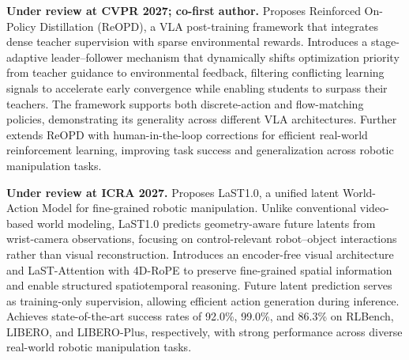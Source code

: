 \documentclass[10pt]{article}
\begin{document}
\textbf{Under review at CVPR 2027; co-first author.}
Proposes Reinforced On-Policy Distillation (ReOPD), a VLA post-training framework that integrates dense teacher supervision with sparse environmental rewards. Introduces a stage-adaptive leader--follower mechanism that dynamically shifts optimization priority from teacher guidance to environmental feedback, filtering conflicting learning signals to accelerate early convergence while enabling students to surpass their teachers. The framework supports both discrete-action and flow-matching policies, demonstrating its generality across different VLA architectures. Further extends ReOPD with human-in-the-loop corrections for efficient real-world reinforcement learning, improving task success and generalization across robotic manipulation tasks.

\textbf{Under review at ICRA 2027.}
Proposes LaST1.0, a unified latent World-Action Model for fine-grained robotic manipulation. Unlike conventional video-based world modeling, LaST1.0 predicts geometry-aware future latents from wrist-camera observations, focusing on control-relevant robot--object interactions rather than visual reconstruction. Introduces an encoder-free visual architecture and LaST-Attention with 4D-RoPE to preserve fine-grained spatial information and enable structured spatiotemporal reasoning. Future latent prediction serves as training-only supervision, allowing efficient action generation during inference. Achieves state-of-the-art success rates of 92.0\%, 99.0\%, and 86.3\% on RLBench, LIBERO, and LIBERO-Plus, respectively, with strong performance across diverse real-world robotic manipulation tasks.

\end{document}
